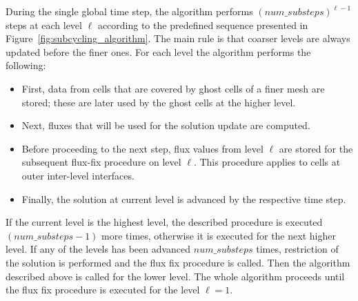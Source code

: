 During the single global time step, the algorithm performs ${(num\_substeps)}^{\ell-1}$ steps at each level $\ell$
according to the predefined sequence presented in Figure~\ref{fig:subcycling_algorithm}. The main rule
is that coarser levels are always updated before the finer ones. For each level the algorithm
performs the following:
\begin{itemize}
\item First, data from cells that are covered by ghost cells of a finer mesh are stored; these are later used
by the ghost cells at the higher level.
\item Next, fluxes that will be used for the solution update are computed.
\item Before proceeding to the next step, flux values from level $\ell$ are stored for the subsequent flux-fix
procedure on level $\ell$. This procedure applies to cells at outer inter-level interfaces.
\item Finally, the solution at current level is advanced by the respective time step.
\end{itemize}
If the current level is the highest level, the described procedure is executed $(num\_substeps-1)$ more times,
otherwise it is executed for the next higher level. If any of the levels has been advanced $num\_substeps$ times,
restriction of the solution is performed and the flux fix procedure is called. Then the algorithm
described above is called for the lower level. The whole algorithm proceeds until the flux fix procedure is
executed for the level $\ell=1$.


